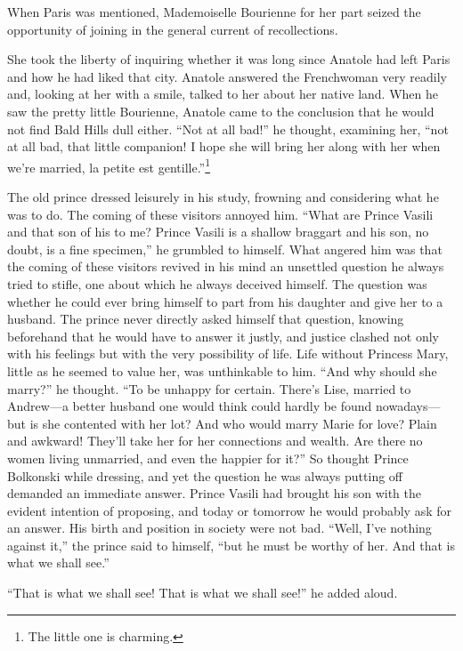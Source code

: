 When Paris was mentioned, Mademoiselle Bourienne for her part
seized the opportunity of joining in the general current of
recollections.

She took the liberty of inquiring whether it was long since
Anatole had left Paris and how he had liked that city. Anatole
answered the Frenchwoman very readily and, looking at her with a
smile, talked to her about her native land. When he saw the
pretty little Bourienne, Anatole came to the conclusion that he
would not find Bald Hills dull either.  ``Not at all bad!'' he
thought, examining her, ``not at all bad, that little companion!
I hope she will bring her along with her when we're married, la
petite est gentille.''\footnote{The little one is charming.}

The old prince dressed leisurely in his study, frowning and
considering what he was to do. The coming of these visitors
annoyed him. ``What are Prince Vasili and that son of his to me?
Prince Vasili is a shallow braggart and his son, no doubt, is a
fine specimen,'' he grumbled to himself. What angered him was
that the coming of these visitors revived in his mind an
unsettled question he always tried to stifle, one about which he
always deceived himself. The question was whether he could ever
bring himself to part from his daughter and give her to a
husband. The prince never directly asked himself that question,
knowing beforehand that he would have to answer it justly, and
justice clashed not only with his feelings but with the very
possibility of life. Life without Princess Mary, little as he
seemed to value her, was unthinkable to him.  ``And why should
she marry?'' he thought. ``To be unhappy for certain.  There's
Lise, married to Andrew---a better husband one would think could
hardly be found nowadays---but is she contented with her lot? And
who would marry Marie for love? Plain and awkward! They'll take
her for her connections and wealth. Are there no women living
unmarried, and even the happier for it?'' So thought Prince
Bolkonski while dressing, and yet the question he was always
putting off demanded an immediate answer.  Prince Vasili had
brought his son with the evident intention of proposing, and
today or tomorrow he would probably ask for an answer.  His birth
and position in society were not bad. ``Well, I've nothing
against it,'' the prince said to himself, ``but he must be worthy
of her.  And that is what we shall see.''

``That is what we shall see! That is what we shall see!'' he
added aloud.

